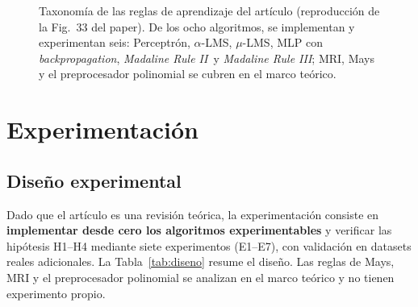 \documentclass[11pt,a4paper]{article}
\newcommand{\aLMS}{$\alpha$-LMS}
\newcommand{\muLMS}{$\mu$-LMS}
\newcommand{\bp}{\textit{backpropagation}}
\newcommand{\mrii}{\textit{Madaline Rule II}}
\newcommand{\mriii}{\textit{Madaline Rule III}}
\begin{document}
\begin{figure}[htbp]
{}
\caption{Taxonomía de las reglas de aprendizaje del artículo (reproducción de la Fig.~33 del paper).
De los ocho algoritmos, se implementan y experimentan seis: Perceptrón, \aLMS, \muLMS, MLP con
\bp, \mrii~y \mriii; MRI, Mays y el preprocesador polinomial se cubren en el marco teórico.}
\label{fig:taxonomia}
\end{figure}

\section{Experimentación}

\subsection{Diseño experimental}

Dado que el artículo es una revisión teórica, la experimentación consiste en \textbf{implementar
desde cero los algoritmos experimentables} y verificar las hipótesis H1--H4 mediante siete
experimentos (E1--E7), con validación en datasets reales adicionales. La
Tabla~\ref{tab:diseno} resume el diseño. Las reglas de Mays, MRI y el preprocesador polinomial
se analizan en el marco teórico y no tienen experimento propio.
\end{document}
